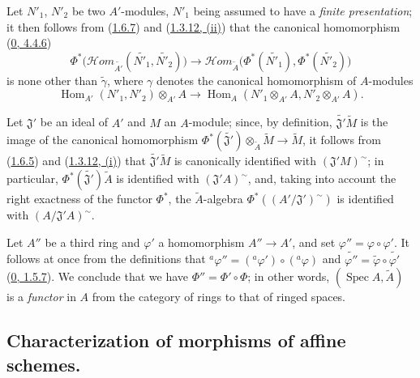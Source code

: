 \begin{env}[1.6.8]
\label{I.1.6.8}
Let $N'_1$, $N'_2$ be two $A'$-modules, $N'_1$ being assumed to have a
\emph{finite presentation}; it then follows from
(\hyperref[I.1.6.7]{1.6.7}) and
(\hyperref[I.1.3.12]{1.3.12, (ii)}) that the canonical homomorphism
(\hyperref[0.4.4.6]{0, 4.4.6})
\[
  \Phi^*\bigl(\mathscr{H}\!om_{\widetilde{A'}}
    (\widetilde{N'_1},\widetilde{N'_2})\bigr)
  \longrightarrow
  \mathscr{H}\!om_{\widetilde A}
    \bigl(\Phi^*(\widetilde{N'_1}),\Phi^*(\widetilde{N'_2})\bigr)
\]
is none other than $\widetilde{\gamma}$, where $\gamma$ denotes
the canonical homomorphism of $A$-modules
\[
  \operatorname{Hom}_{A'}(N'_1,N'_2)\otimes_{A'}A
  \longrightarrow
  \operatorname{Hom}_A(N'_1\otimes_{A'}A,N'_2\otimes_{A'}A).
\]
\end{env}

\begin{env}[1.6.9]
\label{I.1.6.9}
Let $\mathfrak{J}'$ be an ideal of $A'$ and $M$ an $A$-module; since, by
definition, $\widetilde{\mathfrak{J}'}\widetilde M$ is the image of
the canonical homomorphism
$\Phi^*(\widetilde{\mathfrak{J}'})\otimes_{\widetilde A}\widetilde M
\to\widetilde M$, it follows from (\hyperref[I.1.6.5]{1.6.5}) and
(\hyperref[I.1.3.12]{1.3.12, (i)}) that
$\widetilde{\mathfrak{J}'}\widetilde M$ is canonically identified with
$(\mathfrak{J}'M)^{\sim}$; in particular,
$\Phi^*(\widetilde{\mathfrak{J}'})\widetilde A$ is identified with
$(\mathfrak{J}'A)^{\sim}$, and, taking into account the right exactness of
the functor $\Phi^*$, the $\widetilde A$-algebra
$\Phi^*((A'/\mathfrak{J}')^{\sim})$ is identified with
$(A/\mathfrak{J}'A)^{\sim}$.
\end{env}

\begin{env}[1.6.10]
\label{I.1.6.10}
Let $A''$ be a third ring and $\varphi'$ a homomorphism
$A''\to A'$, and set $\varphi''=\varphi\circ\varphi'$. It follows
at once from the definitions that
${}^a\varphi''=({}^a\varphi')\circ({}^a\varphi)$ and
$\widetilde{\varphi''}=\widetilde\varphi\circ\widetilde{\varphi'}$
(\hyperref[0.1.5.7]{0, 1.5.7}). We conclude that we have
$\Phi''=\Phi'\circ\Phi$; in other words,
$(\operatorname{Spec} A,\widetilde A)$ is a \emph{functor} in $A$ from the
category of rings to that of ringed spaces.
\end{env}

\subsection{Characterization of morphisms of affine schemes.}
\label{subsection:I.1.7}

